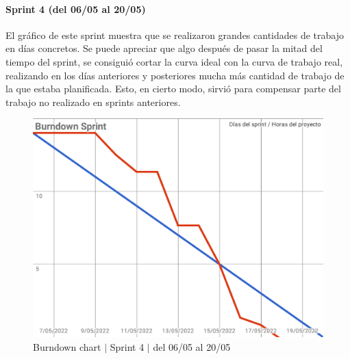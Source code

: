 \paragraph{Sprint 4 (del 06/05 al 20/05)}
El gráfico de este sprint muestra que se realizaron grandes cantidades de trabajo en días concretos. Se puede apreciar que algo después de pasar la mitad del tiempo del sprint, se consiguió cortar la curva ideal con la curva de trabajo real, realizando en los días anteriores y posteriores mucha más cantidad de trabajo de la que estaba planificada. Esto, en cierto modo, sirvió para compensar parte del trabajo no realizado en sprints anteriores.
\begin{figure}[H]
    \centering
    \includegraphics[width=1\linewidth]{text/image/BurndownChart4.pdf}
    \caption{Burndown chart $|$ Sprint 4 $|$ del 06/05 al 20/05}
    \label{fig:burndown_chart_4}
\end{figure}

\newpage
